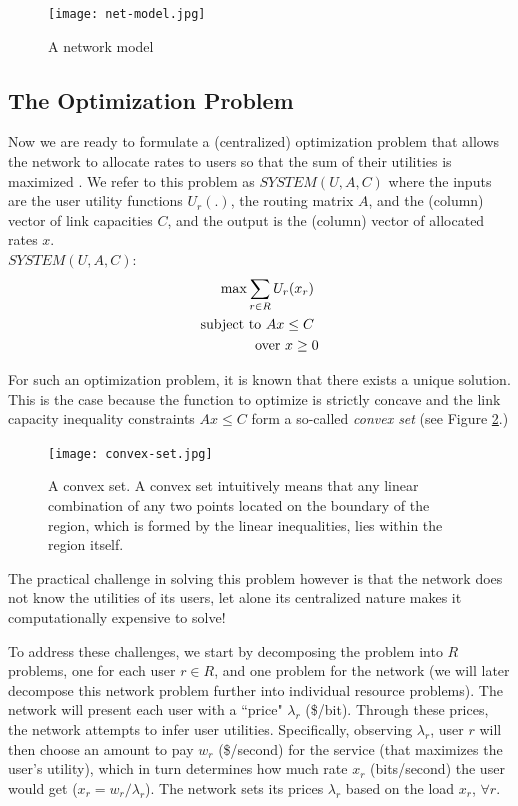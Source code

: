 \documentclass{article}
\begin{document}
\begin{figure}[htbp] %
   \centering
   \texttt{[image: net-model.jpg]} 
   \caption{A network model}
   \label{fig:net-model}
\end{figure}


\subsection{The Optimization Problem}

Now we are ready to formulate a (centralized) optimization problem that allows the network to allocate rates to users so that the sum of their utilities is maximized \cite{Kelly-2001}. We refer to this problem as $SYSTEM(U, A, C)$ where the inputs are the user utility functions $U_r(.)$, the routing matrix $A$, and the (column) vector of link capacities $C$, and the output is the (column) vector of allocated rates $x$. \\

$SYSTEM(U, A, C):$
\begin{eqnarray*}
{\rm max} \sum_{r \in R} U_r(x_r) \ \\
{\rm subject~to}\ A x \leq C \ \\
{\rm over}\  x \geq 0
\end{eqnarray*}

For such an optimization problem, it is known that there exists a unique solution. This is the case because the function to optimize is strictly concave and the link capacity inequality constraints $A x \leq C$ form a so-called {\em convex set} (see Figure \ref{fig:convex-set}.)

\begin{figure}[htbp] %
   \centering
   \texttt{[image: convex-set.jpg]} 
   \caption{A convex set. A convex set intuitively means that any linear combination of any two points located on the boundary of the region, which is formed by the linear inequalities, lies within the region itself. }
   \label{fig:convex-set}
\end{figure}

The practical challenge in solving this problem however is that the network does not know the utilities of its users, let alone its centralized nature makes it computationally expensive to solve!

To address these challenges, we start by decomposing the problem into $R$ problems, one for each user $r \in R$, and one problem for the network (we will later decompose this network problem further into individual resource problems). The network will present each user with a ``price" $\lambda_r$ (\$/bit).
Through these prices, the network attempts to infer user utilities.
Specifically, observing $\lambda_r$,
user $r$ will then choose an amount to pay $w_r$ (\$/second) for the service (that maximizes the user's utility), 
which in turn determines how much rate $x_r$ (bits/second) the user would get ($x_r = w_r/\lambda_r$).  
The network sets its prices $\lambda_r$ based on the load $x_r$, $\forall r$.
\end{document}
